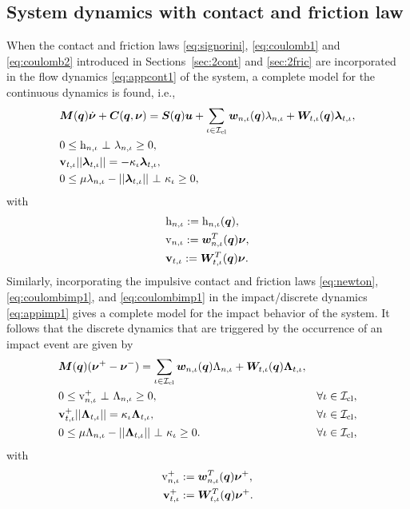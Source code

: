 \documentclass[../DC2019003Bouma.tex]{subfiles}
\begin{document}
\subsection{System dynamics with contact and friction law}\label{sec:2contfric}
When the contact and friction laws \eqref{eq:signorini}, \eqref{eq:coulomb1} and \eqref{eq:coulomb2} introduced in Sections~\ref{sec:2cont} and \ref{sec:2fric} are incorporated in the flow dynamics \eqref{eq:appcont1} of the system, a complete model for the continuous dynamics is found, i.e.,
\begin{align}
&\Mb(\qb)\dot{\nub} + \Cb(\qb,\nub) = \Sb(\qb)\ub + \sum_{\iota\in\Ic_{\text{cl}}}\wb_{n,\iota}(\qb)\lambda_{n,\iota} + \Wb_{t,\iota}(\qb)\lambdab_{t,\iota}, \label{eq:ncpcontact1}\\
&0\leq \hrm_{n,\iota}\ \bot\ \lambda_{n,\iota} \geq 0,\label{eq:ncpcontact2}\\
&\vbf_{t,\iota}||\lambdab_{t,\iota}|| = -\kappa_{\iota}\lambdab_{t,\iota},\label{eq:ncpcontact3}\\
&0\leq \mu\lambda_{n,\iota} - ||\lambdab_{t,\iota}||\ \bot\ \kappa_{\iota} \geq 0,\label{eq:ncpcontact4}
\end{align}
with 
\begin{align}
&\mathrm{h}_{n,\iota} := \mathrm{h}_{n,\iota}({\boldsymbol{q}}),\label{eq:h}\\
&\mathrm{v}_{n,\iota} := {\boldsymbol{w}}^T_{n,\iota}({\boldsymbol{q}}) \boldsymbol{\nu},  \label{eq:zetan}\\
&\mathbf{v}_{t,\iota} := {\boldsymbol{W}}^T_{t,\iota}({\boldsymbol{q}}) \boldsymbol{\nu}. \label{eq:zetab}
\end{align}
Similarly, incorporating the impulsive contact and friction laws \eqref{eq:newton}, \eqref{eq:coulombimp1}, and \eqref{eq:coulombimp1} in the impact/discrete dynamics \eqref{eq:appimp1} gives a complete model for the impact behavior of the system. It follows that the discrete dynamics that are triggered by the occurrence of an impact event are given by
\begin{align}
&\Mb(\qb)(\nub^+ - \nub^-) = \sum_{\iota\in\Ic_{\text{cl}}} \wb_{n,\iota}(\qb)\Lambda_{n,\iota} + \Wb_{t,\iota}(\qb)\Lambdab_{t,\iota}, \label{eq:ncpimpact1}\\
&0\leq \vrm_{n,\iota}^+\ \bot\ \Lambda_{n,\iota} \geq 0, &\forall \iota\in\Ic_{\text{cl}},\label{eq:ncpimpact2}\\
&\vbf_{t,\iota}^+||\Lambdab_{t,\iota}|| = \kappa_{\iota}\Lambdab_{t,\iota},  &\forall \iota\in\Ic_{\text{cl}},\label{eq:ncpimpact3}\\
&0 \leq \mu\Lambda_{n,\iota} - ||\Lambdab_{t,\iota}||\ \bot\ \kappa_{\iota} \geq 0. &\forall \iota\in\Ic_{\text{cl}},\label{eq:ncpimpact4}
\end{align}
with 
\begin{align}
\mathrm{v}^+_{n,\iota} &:= {\boldsymbol{w}}^T_{n,\iota}({\boldsymbol{q}}) \boldsymbol{\nu}^+,\\
\mathbf{v}^+_{t,\iota} &:= {\boldsymbol{W}}^T_{t,\iota}({\boldsymbol{q}}) \boldsymbol{\nu}^+.\label{eq:ncpimpactend}
\end{align}
\end{document}
